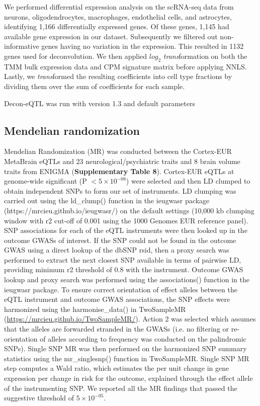 {We performed differential expression analysis on the scRNA-seq data from neurons, oligodendrocytes, macrophages, endothelial cells, and astrocytes, identifying 1,166 differentially expressed genes. Of these genes, 1,145 had available gene expression in our dataset. Subsequently we filtered out non-informative genes having no variation in the expression. This resulted in 1132 genes used for deconvolution. We then applied $log_2$ \emph{trans}formation on both the TMM bulk expression data and CPM signature matrix before applying NNLS. Lastly, we \emph{trans}formed the resulting coefficients into cell type fractions by dividing them over the sum of coefficients for each sample\cite{galtonRegressionMediocrityHereditary1886}. 

Decon-eQTL\cite{raulaguirregamboaDeconvolutionBulkBlood2020} was run with version 1.3 and default parameters

\subsection{Mendelian randomization}
Mendelian Randomization (MR) was conducted between the Cortex-EUR MetaBrain eQTLs and 23 neurological/psychiatric traits and 8 brain volume traits from ENIGMA (\textbf{Supplementary Table 8}). Cortex-EUR eQTLs at genome-wide significant (P $< 5 \times 10^{-08}$) were selected and then LD clumped to obtain independent SNPs to form our set of instruments. LD clumping was carried out using the ld\_clump() function in the ieugwasr package (https://mrcieu.github.io/ieugwasr/) on the default settings (10,000 kb clumping window with r2 cut-off of 0.001 using the 1000 Genomes EUR reference panel). SNP associations for each of the eQTL instruments were then looked up in the outcome GWASs of interest. If the SNP could not be found in the outcome GWAS using a direct lookup of the dbSNP rsid, then a proxy search was performed to extract the next closest SNP available in terms of pairwise LD, providing minimum r2 threshold of 0.8 with the instrument. Outcome GWAS lookup and proxy search was performed using the associations() function in the ieugwasr package. To ensure correct orientation of effect alleles between the eQTL instrument and outcome GWAS associations, the SNP effects were harmonized using the harmonise\_data() in TwoSampleMR (\url{https://mrcieu.github.io/TwoSampleMR/}). Action 2 was selected which assumes that the alleles are forwarded stranded in the GWASs (i.e. no filtering or re-orientation of alleles according to frequency was conducted on the palindromic SNPs). Single SNP MR was then performed on the harmonized SNP summary statistics using the mr\_singlesnp() function in TwoSampleMR. Single SNP MR step computes a Wald ratio, which estimates the per unit change in gene expression per change in risk for the outcome, explained through the effect allele of the instrumenting SNP. We reported all the MR findings that passed the suggestive threshold of $5 \times 10^{-05}$. 

}
